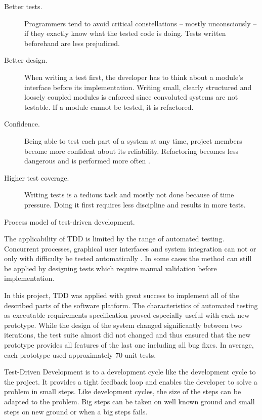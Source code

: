 \begin{description}
\item[Better tests.]{Programmers tend to avoid critical constellations -- mostly unconsciously -- if they exactly know what the tested code is doing. Tests written beforehand are less prejudiced.}

\item[Better design.]{When writing a test first, the developer has to think about a module's interface before its implementation. Writing small, clearly structured and loosely coupled modules is enforced since convoluted systems are not testable. If a module cannot be tested, it is refactored.}

\item[Confidence.]{Being able to test each part of a system at any time, project members
become more confident about its reliability. Refactoring becomes less dangerous
and is performed more often \cite{FowlerRefactoring}.}

\item[Higher test coverage.]{Writing tests is a tedious task and mostly not done because
of time pressure. Doing it first requires less discipline and results in more tests.}

\end{description}

{Process model of test-driven development.}

The applicability of TDD is limited by the range of automated testing. Concurrent processes, graphical user interfaces and system integration can not or only with difficulty be tested automatically \cite{ExtremeProgramming}. In some cases the method can still be applied by designing tests which require manual validation before implementation.

In this project, TDD was applied with great success to implement all of the described parts of the software platform. The characteristics of automated testing as executable requirements specification proved especially useful with each new prototype. While the design of the system changed significantly between two iterations, the test suite almost did not changed and thus ensured that the new prototype provides all features of the last one including all bug fixes. In average, each prototype used approximately 70 unit tests.

Test-Driven Development is to a development cycle like the development cycle to the project. It provides a tight feedback loop and enables the developer to solve a problem in small steps. Like development cycles, the size of the steps can be adapted to the problem. Big steps can be taken on well known ground and small steps on new ground or when a big steps fails.
